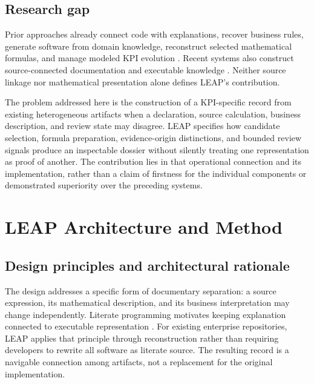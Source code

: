 \documentclass[a4paper,fleqn]{cas-dc}
\newcommand{\tool}{\textsc{LEAP}}
\begin{document}
\subsection{Research gap}

Prior approaches already connect code with explanations, recover business rules, generate software from domain knowledge, reconstruct selected mathematical formulas, and manage modeled KPI evolution \citep{Normark2000,PutryczKark2008,Moser2015,Moseler2021,Carette2023,DeSanctis2022,Dominguez2025}. Recent systems also construct source-connected documentation and executable knowledge \citep{Kelious2026,Gao2026}. Neither source linkage nor mathematical presentation alone defines LEAP's contribution.

The problem addressed here is the construction of a KPI-specific record from existing heterogeneous artifacts when a declaration, source calculation, business description, and review state may disagree. LEAP specifies how candidate selection, formula preparation, evidence-origin distinctions, and bounded review signals produce an inspectable dossier without silently treating one representation as proof of another. The contribution lies in that operational connection and its implementation, rather than a claim of firstness for the individual components or demonstrated superiority over the preceding systems.

\section{LEAP Architecture and Method}
\label{sec:method}

\subsection{Design principles and architectural rationale}

The design addresses a specific form of documentary separation: a source expression, its mathematical description, and its business interpretation may change independently. Literate programming motivates keeping explanation connected to executable representation \citep{Knuth1984}. For existing enterprise repositories, \tool{} applies that principle through reconstruction rather than requiring developers to rewrite all software as literate source. The resulting record is a navigable connection among artifacts, not a replacement for the original implementation.
\end{document}
